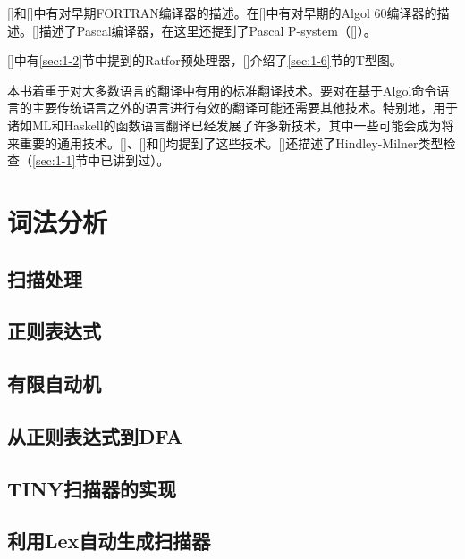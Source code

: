 \documentclass[lang=cn,10pt]{elegantbook}
\newcommand\citeauthoryear[1]{\citeauthor{#1}[\citeyear{#1}]}
\begin{document}
\citeauthoryear{backus1957fortran}和\citeauthoryear{backus1978history}中有对早期FORTRAN编译器的描述。在\citeauthoryear{randell1964algol}中有对早期的Algol 60编译器的描述。\citeauthoryear{barron1981pascal}描述了Pascal编译器，在这里还提到了Pascal P-system（\citeauthoryear{nori1981pascal}）。

\citeauthoryear{kernighan1975ratfor}中有\ref{sec:1-2}节中提到的Ratfor预处理器，\citeauthoryear{bratman1961alternate}介绍了\ref{sec:1-6}节的T型图。

本书着重于对大多数语言的翻译中有用的标准翻译技术。要对在基于Algol命令语言的主要传统语言之外的语言进行有效的翻译可能还需要其他技术。特别地，用于诸如ML和Haskell的函数语言翻译已经发展了许多新技术，其中一些可能会成为将来重要的通用技术。\citeauthoryear{appel2007compiling}、\citeauthoryear{peyton1992implementing}和\citeauthoryear{peyton1987implementation}均提到了这些技术。\citeauthoryear{peyton1987implementation}还描述了Hindley-Milner类型检查（\ref{sec:1-1}节中已讲到过）。

\chapter{词法分析}
\label{chap:2}

\section{扫描处理}
\label{sec:2-1}

\section{正则表达式}
\label{sec:2-2}

\section{有限自动机}
\label{sec:2-3}

\section{从正则表达式到DFA}
\label{sec:2-4}

\section{TINY扫描器的实现}
\label{sec:2-5}

\section{利用Lex自动生成扫描器}
\label{sec:2-6}
\end{document}
